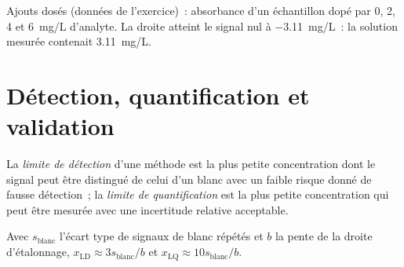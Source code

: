 \begin{omfigure}

{\small Ajouts dosés (données de l'exercice)~: absorbance d'un échantillon dopé par 0, 2, 4 et
\qty{6}{mg/L} d'analyte. La droite atteint le signal nul à \qty{-3.11}{mg/L}~: la solution mesurée
contenait \qty{3.11}{mg/L}.}
\end{omfigure}

\section{Détection, quantification et validation}

\begin{definition}[Limites]\label{def:b2:measurement-statistics:limits}
La \emph{limite de détection} d'une méthode est la plus
petite concentration dont le signal peut être distingué de celui d'un blanc avec un faible risque donné
de fausse détection~; la \emph{limite de quantification} est la plus
petite concentration qui peut être mesurée avec une incertitude relative acceptable.
\end{definition}

\begin{proposition}\label{prop:b2:measurement-statistics:lod}
Avec $s_{\mathrm{blanc}}$ l'écart type de signaux de blanc répétés et $b$ la pente de la droite
d'étalonnage, $x_{\mathrm{LD}} \approx 3s_{\mathrm{blanc}}/b$ et $x_{\mathrm{LQ}} \approx
10s_{\mathrm{blanc}}/b$.
\end{proposition}

